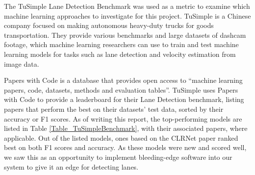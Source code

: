 \documentclass[titlepage,draft]{article}
\begin{document}
The TuSimple Lane Detection Benchmark\cite{TuSimpleBenchmark} was used as a metric to examine which machine learning approaches
to investigate for this project.
TuSimple is a Chinese company focused on making autonomous heavy-duty trucks for goods transportation.
They provide various benchmarks and large datasets of dashcam footage, which machine learning researchers can use to train and
test machine learning models for tasks such as lane detection and velocity estimation from image data. \cite{TuSimpleBenchmark}

Papers with Code is a database that provides open access to ``machine learning papers, code, datasets, methods and evaluation
tables''. \cite{PapersWithCode}
TuSimple uses Papers with Code to provide a leaderboard for their Lane Detection benchmark, listing papers that perform the best
on their datasets' test data, sorted by their accuracy or F1 scores.
As of writing this report, the top-performing models are listed in Table \ref{Table_TuSimpleBenchmark}, with their associated
papers, where applicable.
Out of the listed models, ones based on the CLRNet paper ranked best on both F1 scores and accuracy.
As these models were new and scored well, we saw this as an opportunity to implement bleeding-edge software into our system
to give it an edge for detecting lanes.
\end{document}
